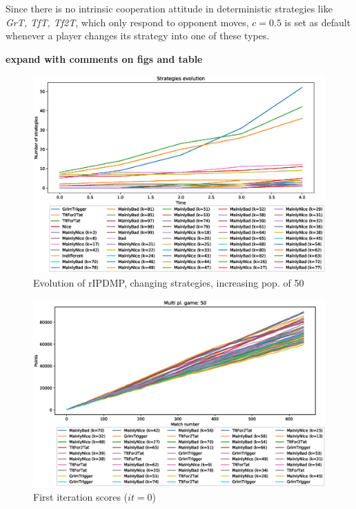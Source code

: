 \documentclass[journal,10pt,twoside]{IEEEtran}
\begin{document}
Since there is no intrinsic cooperation attitude in deterministic strategies like \textit{GrT, TfT, Tf2T}, which only respond to opponent moves, $c=0.5$ is set as default whenever a player changes its strategy into one of these types.

\textbf{expand with comments on figs and table}

\begin{figure}[!ht]
    \centering
    \includegraphics[width=1\columnwidth]{../img/cipdmp-incr/cipdmp-evolution-increasing-pop-50}
    \caption{Evolution of rIPDMP, changing strategies, increasing pop. of 50}
    \label{fig:incrC}
\end{figure}

\begin{figure}[!ht]
    \centering
    \includegraphics[width=1\columnwidth]{../img/cipdmp-incr/cipdmp-scores-increasing-pop-50-r0}
    \caption{First iteration scores ($it=0$)}
    \label{fig:incrCFI}
\end{figure}
\end{document}
